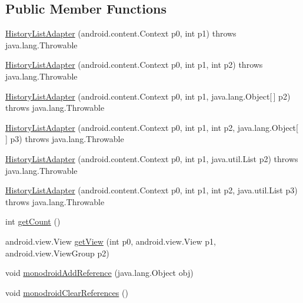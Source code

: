 \subsection*{Public Member Functions}
\begin{DoxyCompactItemize}
\item 
\hyperlink{classfieldservice_1_1android_1_1adapters_1_1_history_list_adapter_a94ff167b2d1b2f6994cba393acf732c0}{History\+List\+Adapter} (android.\+content.\+Context p0, int p1)  throws java.\+lang.\+Throwable 	
\item 
\hyperlink{classfieldservice_1_1android_1_1adapters_1_1_history_list_adapter_ab2395bce068891d7294dc7c9f947dffa}{History\+List\+Adapter} (android.\+content.\+Context p0, int p1, int p2)  throws java.\+lang.\+Throwable 	
\item 
\hyperlink{classfieldservice_1_1android_1_1adapters_1_1_history_list_adapter_a43f101909db176479973f1020790cdf4}{History\+List\+Adapter} (android.\+content.\+Context p0, int p1, java.\+lang.\+Object\mbox{[}$\,$\mbox{]} p2)  throws java.\+lang.\+Throwable 	
\item 
\hyperlink{classfieldservice_1_1android_1_1adapters_1_1_history_list_adapter_a0f139c11cd4ce04878b40ccfec02d1fa}{History\+List\+Adapter} (android.\+content.\+Context p0, int p1, int p2, java.\+lang.\+Object\mbox{[}$\,$\mbox{]} p3)  throws java.\+lang.\+Throwable 	
\item 
\hyperlink{classfieldservice_1_1android_1_1adapters_1_1_history_list_adapter_a9c7a0689546f6ca2895df003a5d9a06b}{History\+List\+Adapter} (android.\+content.\+Context p0, int p1, java.\+util.\+List p2)  throws java.\+lang.\+Throwable 	
\item 
\hyperlink{classfieldservice_1_1android_1_1adapters_1_1_history_list_adapter_a1559b3f2ef66070436988c62a24cf75b}{History\+List\+Adapter} (android.\+content.\+Context p0, int p1, int p2, java.\+util.\+List p3)  throws java.\+lang.\+Throwable 	
\item 
int \hyperlink{classfieldservice_1_1android_1_1adapters_1_1_history_list_adapter_a5ecc691bcea279b4a4eca0dd980a5c87}{get\+Count} ()
\item 
android.\+view.\+View \hyperlink{classfieldservice_1_1android_1_1adapters_1_1_history_list_adapter_a73d7a4af0aad3135cca429cb86bfa719}{get\+View} (int p0, android.\+view.\+View p1, android.\+view.\+View\+Group p2)
\item 
void \hyperlink{classfieldservice_1_1android_1_1adapters_1_1_history_list_adapter_a1aa947691bab63929934c2a2ff42b5a8}{monodroid\+Add\+Reference} (java.\+lang.\+Object obj)
\item 
void \hyperlink{classfieldservice_1_1android_1_1adapters_1_1_history_list_adapter_a145267fffa08f4a509536403988f7769}{monodroid\+Clear\+References} ()
\end{DoxyCompactItemize}


